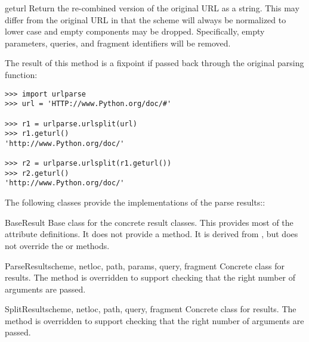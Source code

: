 \begin{methoddesc}[ParseResult]{geturl}{}
  Return the re-combined version of the original URL as a string.
  This may differ from the original URL in that the scheme will always
  be normalized to lower case and empty components may be dropped.
  Specifically, empty parameters, queries, and fragment identifiers
  will be removed.

  The result of this method is a fixpoint if passed back through the
  original parsing function:

\begin{verbatim}
>>> import urlparse
>>> url = 'HTTP://www.Python.org/doc/#'

>>> r1 = urlparse.urlsplit(url)
>>> r1.geturl()
'http://www.Python.org/doc/'

>>> r2 = urlparse.urlsplit(r1.geturl())
>>> r2.geturl()
'http://www.Python.org/doc/'
\end{verbatim}

\end{methoddesc}

The following classes provide the implementations of the parse results::

\begin{classdesc*}{BaseResult}
  Base class for the concrete result classes.  This provides most of
  the attribute definitions.  It does not provide a 
  method.  It is derived from , but does not override the
   or  methods.
\end{classdesc*}


\begin{classdesc}{ParseResult}{scheme, netloc, path, params, query, fragment}
  Concrete class for  results.  The
   method is overridden to support checking that the
  right number of arguments are passed.
\end{classdesc}


\begin{classdesc}{SplitResult}{scheme, netloc, path, query, fragment}
  Concrete class for  results.  The
   method is overridden to support checking that the
  right number of arguments are passed.
\end{classdesc}
